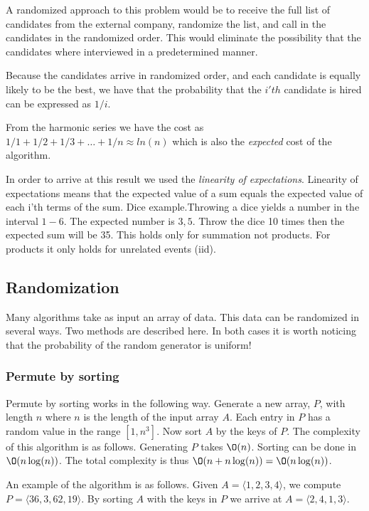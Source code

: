 \documentclass[10pt]{article}
\begin{document}
A randomized approach to this problem would be to receive the full list of candidates from the external company, randomize the list, and call in the candidates in the randomized order. This would eliminate the possibility that the candidates where interviewed in a predetermined manner.

Because the candidates arrive in randomized order, and each candidate is equally likely to be the best, we have that the probability that the $i'th$ candidate is hired can be expressed as $1/i$.

From the harmonic series we have the cost as $1/1+1/2+1/3+\ldots+1/n \approx ln(n)$ which is also the \emph{expected} cost of the algorithm. 

In order to arrive at this result we used the \emph{linearity of expectations}. Linearity of expectations means that the expected value of a sum equals the expected value of each i'th terms of the sum. Dice example.Throwing a dice yields a number in the interval $1-6$. The expected number is $3,5$. Throw the dice 10 times then the expected sum will be 35. This holds only for summation not products. For products it only holds for unrelated events (iid).



\subsection{Randomization} %
\label{sub:randomization}
Many algorithms take as input an array of data. This data can be randomized in several ways. Two methods are described here. In both cases it is worth noticing that the probability of the random generator is uniform! 

\subsubsection{Permute by sorting} %
\label{ssub:permute_by_sorting}
Permute by sorting works in the following way. Generate a new array, $P$, with length $n$ where $n$ is the length of the input array $A$. Each entry in $P$ has a random value in the range $[1,n^3]$. Now sort $A$ by the keys of $P$. The complexity of this algorithm is as follows. Generating $P$ takes $\O(n)$. Sorting can be done in $\O(n\log(n))$. The total complexity is thus $\O(n+n\log(n)) = \O(n\log(n))$.

An example of the algorithm is as follows. Given $A = \langle 1,2,3,4\rangle$, we compute $P = \langle 36, 3, 62, 19\rangle$. By sorting $A$ with the keys in $P$ we arrive at $A = \langle 2, 4, 1, 3 \rangle$.
\end{document}
